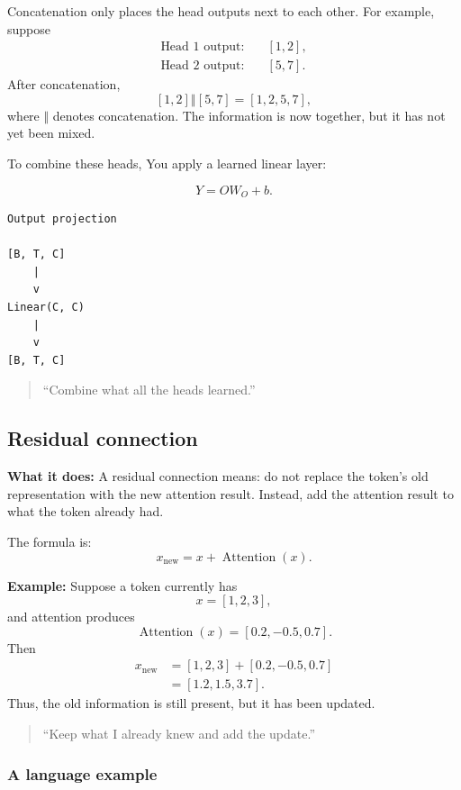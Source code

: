 Concatenation only places the head outputs next to each other. For example,
suppose
\begin{align*}
  \text{Head 1 output:}&\quad [1,2],\\
  \text{Head 2 output:}&\quad [5,7].
\end{align*}
After concatenation,
\[
  [1,2]\mathbin{\Vert}[5,7]=[1,2,5,7],
\]
where \(\Vert\) denotes concatenation. The information is now together, but
it has not yet been mixed. 

To combine these heads, You apply a learned linear layer:

\[
  Y=OW_O+b.
\]

\begin{lstlisting}[style=shadedpython]
Output projection

[B, T, C]
    |
    v
Linear(C, C)
    |
    v
[B, T, C]
\end{lstlisting}

\begin{quote}
  ``Combine what all the heads learned.''
\end{quote}

\subsection{Residual connection}

\textbf{What it does:} A residual connection means: do not replace the
token's old representation with the new attention result. Instead, add the
attention result to what the token already had.

The formula is:
\[
  x_{\text{new}}=x+\operatorname{Attention}(x).
\]

\textbf{Example:} Suppose a token currently has
\[
  x=[1,2,3],
\]
and attention produces
\[
  \operatorname{Attention}(x)=[0.2,-0.5,0.7].
\]
Then
\begin{align*}
  x_{\text{new}}
  &=[1,2,3]+[0.2,-0.5,0.7]\\
  &=[1.2,1.5,3.7].
\end{align*}
Thus, the old information is still present, but it has been updated.

\begin{quote}
  ``Keep what I already knew and add the update.''
\end{quote}

\subsubsection*{A language example}

